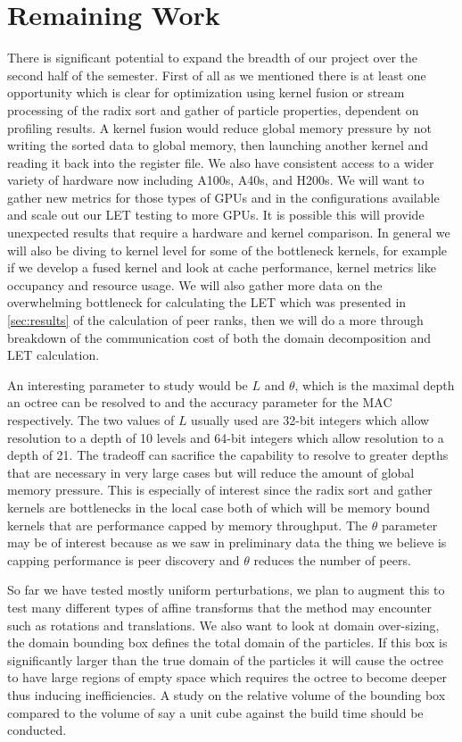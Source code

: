 \section{Remaining Work}

There is significant potential to expand the breadth of our project over the second half of the semester. First of all as we mentioned there is at least one opportunity which is clear for optimization using kernel fusion or stream processing of the radix sort and gather of particle properties, dependent on profiling results. A kernel fusion would reduce global memory pressure by not writing the sorted data to global memory, then launching another kernel and reading it back into the register file. We also have consistent access to a wider variety of hardware now including A100s, A40s, and H200s. We will want to gather new metrics for those types of GPUs and in the configurations available and scale out our LET testing to more GPUs. It is possible this will provide unexpected results that require a hardware and kernel comparison. In general we will also be diving to kernel level for some of the bottleneck kernels, for example if we develop a fused kernel and look at cache performance, kernel metrics like occupancy and resource usage. We will also gather more data on the overwhelming bottleneck for calculating the LET which was presented in \ref{sec:results} of the calculation of peer ranks, then we will do a more through breakdown of the communication cost of both the domain decomposition and LET calculation.

An interesting parameter to study would be $L$ and $\theta$, which is the maximal depth an octree can be resolved to and the accuracy parameter for the MAC respectively. The two values of $L$ usually used are 32-bit integers which allow resolution to a depth of 10 levels and 64-bit integers which allow resolution to a depth of 21. The tradeoff can sacrifice the capability to resolve to greater depths that are necessary in very large cases but will reduce the amount of global memory pressure. This is especially of interest since the radix sort and gather kernels are bottlenecks in the local case both of which will be memory bound kernels that are performance capped by memory throughput. The $\theta$ parameter may be of interest because as we saw in preliminary data the thing we believe is capping performance is peer discovery and $\theta$ reduces the number of peers.

So far we have tested mostly uniform perturbations, we plan to augment this to test many different types of affine transforms that the method may encounter such as rotations and translations. We also want to look at domain over-sizing, the domain bounding box defines the total domain of the particles. If this box is significantly larger than the true domain of the particles it will cause the octree to have large regions of empty space which requires the octree to become deeper thus inducing inefficiencies. A study on the relative volume of the bounding box compared to the volume of say a unit cube against the build time should be conducted.

